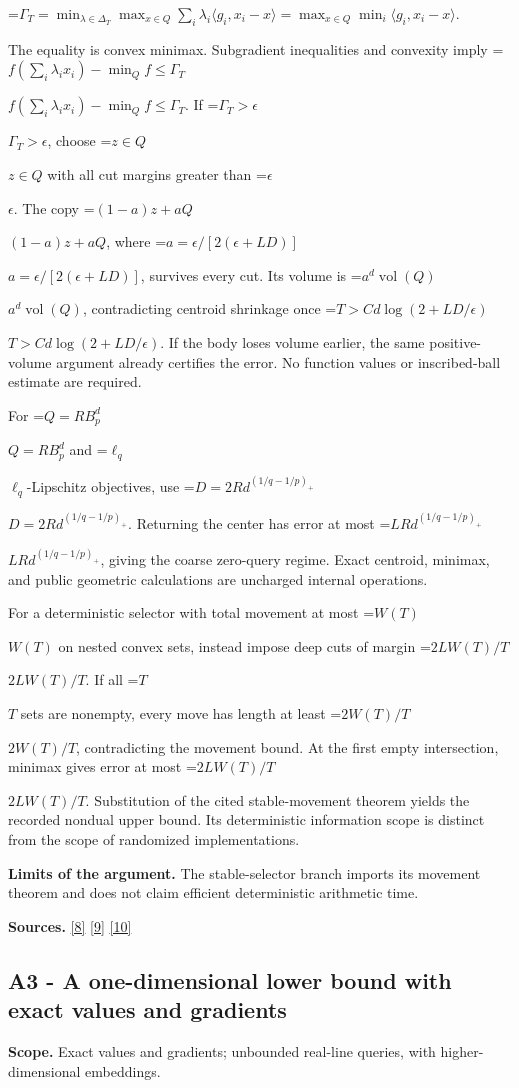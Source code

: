 \documentclass[10pt,a4paper]{article}
\newcommand{\AtlasMath}[1]{\par\begingroup\centering\setbox0=\hbox{$\displaystyle #1$}\ifdim\wd0>1.4\linewidth\typeout{ATLAS WIDE FORMULA: \the\wd0}\fi\ifdim\wd0>\linewidth\resizebox{\linewidth}{!}{\box0}\else\box0\fi\par\endgroup}
\newcommand{\AtlasInlineMath}[1]{\begingroup\setbox0=\hbox{$#1$}\ifdim\wd0>.4\linewidth\endgroup\AtlasMath{#1}\else\endgroup$#1$\fi}
\begin{document}
\AtlasMath{\Gamma_T=\min_{\lambda\in\Delta_T}\max_{x\in Q}\sum_i\lambda_i\langle g_i,x_i-x\rangle
=\max_{x\in Q}\min_i\langle g_i,x_i-x\rangle.}

The equality is convex minimax. Subgradient inequalities and convexity imply
\AtlasInlineMath{f(\sum_i\lambda_ix_i)-\min_Qf\le\Gamma_T}.
If \AtlasInlineMath{\Gamma_T>\epsilon}, choose \AtlasInlineMath{z\in Q} with all cut margins greater than \AtlasInlineMath{\epsilon}. The copy \AtlasInlineMath{(1-a)z+aQ}, where \AtlasInlineMath{a=\epsilon/[2(\epsilon+LD)]}, survives every cut. Its volume is \AtlasInlineMath{a^d\operatorname{vol}(Q)}, contradicting centroid shrinkage once \AtlasInlineMath{T>C d\log(2+LD/\epsilon)}. If the body loses volume earlier, the same positive-volume argument already certifies the error. No function values or inscribed-ball estimate are required.

For \AtlasInlineMath{Q=RB_p^d} and \AtlasInlineMath{\ell_q}-Lipschitz objectives, use \AtlasInlineMath{D=2Rd^{(1/q-1/p)_+}}. Returning the center has error at most \AtlasInlineMath{LRd^{(1/q-1/p)_+}}, giving the coarse zero-query regime. Exact centroid, minimax, and public geometric calculations are uncharged internal operations.

For a deterministic selector with total movement at most \AtlasInlineMath{W(T)} on nested convex sets, instead impose deep cuts of margin \AtlasInlineMath{2LW(T)/T}. If all \AtlasInlineMath{T} sets are nonempty, every move has length at least \AtlasInlineMath{2W(T)/T}, contradicting the movement bound. At the first empty intersection, minimax gives error at most \AtlasInlineMath{2LW(T)/T}. Substitution of the cited stable-movement theorem yields the recorded nondual upper bound. Its deterministic information scope is distinct from the scope of randomized implementations.

\textbf{Limits of the argument.} The stable-selector branch imports its movement theorem and does not claim efficient deterministic arithmetic time.

\textbf{Sources.} \href{https://arxiv.org/pdf/1405.4980}{[8]} \href{https://www2.isye.gatech.edu/~nemirovs/MOR_AccuracyCertificates.pdf}{[9]} \href{https://arxiv.org/pdf/2609.20701}{[10]}

\subsection{A3 - A one-dimensional lower bound with exact values and gradients}
\textbf{Scope.} Exact values and gradients; unbounded real-line queries, with higher-dimensional embeddings.
\end{document}
